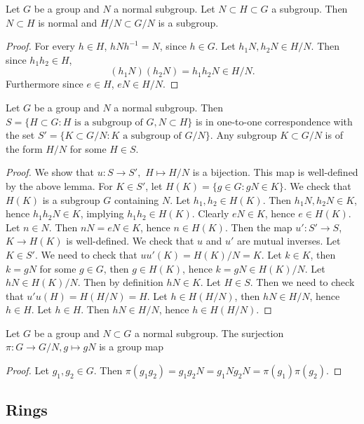 \begin{lemma}\label{SubgroupOfQuoutientGroup}
    Let $G$ be a group and $N$ a normal subgroup. Let $N\subset H\subset G$ a subgroup. Then $N\subset H$ is normal and $H/N \subset G/N$ is a subgroup. 
\end{lemma}
\begin{proof}
    For every $h\in H$, $hNh^{-1} = N$, since $h\in G$. Let $h_1N,h_2N\in H/N$. Then since $h_1h_2\in H$, 
    $$(h_1N)(h_2N)=h_1h_2N \in H/N.$$
    Furthermore since $e\in H$, $eN \in H/N.$
\end{proof}
\begin{proposition}\label{ClassificationOfSubgroupsOfQuotientGroup}
    Let $G$ be a group and $N$ a normal subgroup. Then \\ $S =\{H\subset G : H \text{ is a subgroup of } G, N\subset H\}$ is in one-to-one correspondence with the set $S' = \{ K \subset G/N : K \text{ a subgroup of } G/N\}.$ Any subgroup $K\subset G/N$ is of the form $H/N$ for some $H\in S$.
\end{proposition}
\begin{proof}
    We show that $u : S \rightarrow S',$ $H \mapsto H/N$ is a bijection. This map is well-defined by the above lemma. For $K \in S'$, let $H(K) = \{ g\in G : gN \in K\}$. We check that $H(K)$ is a subgroup $G$ containing $N$. Let $h_1,h_2\in H(K)$. Then $h_1N,h_2N\in K$, hence $h_1h_2N\in K$, implying $h_1h_2\in H(K)$. Clearly $eN \in K$, hence $e \in H(K)$. Let $n\in N$. Then $nN = eN \in K$, hence $n\in H(K)$. Then the map $u' : S' \rightarrow S$, $K \rightarrow H(K)$ is well-defined. We check that $u$ and $u'$ are mutual inverses. Let $K \in S'$. We need to check that $uu'(K)=H(K)/N = K$. Let $k \in K$, then $k = gN$ for some $g\in G$, then $g\in H(K)$, hence $k=gN \in H(K)/N$. Let $hN \in H(K)/N$. Then by definition $hN \in K$. Let $H \in S$. Then we need to check that $u'u(H) = H(H/N) = H$. Let $h \in H(H/N)$, then $hN \in H/N$, hence $h\in H$. Let $h \in H$. Then $hN\in H/N$, hence $h \in H(H/N).$ 
\end{proof}
\begin{proposition}
    Let $G$ be a group and $N\subset G$ a normal subgroup. The surjection $\pi : G\rightarrow G/N, g\mapsto gN$ is a group map
\end{proposition}
\begin{proof}
    Let $g_1,g_2\in G$. Then $\pi(g_1g_2)=g_1g_2N= g_1Ng_2N=\pi(g_1)\pi(g_2)$.
\end{proof}    
\subsection{Rings}
